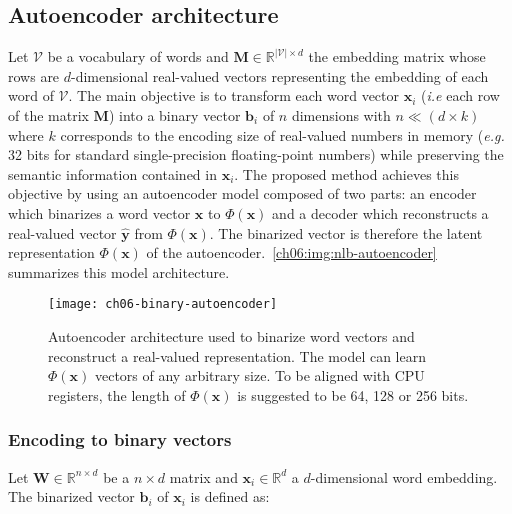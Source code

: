   \subsection{Autoencoder architecture}
    Let $\mathcal{V}$ be a vocabulary of words and $\mathbf{M} \in
    \mathbb{R}^{|\mathcal{V}| \times d}$ the embedding matrix whose rows are
    $d$-dimensional real-valued vectors representing the embedding of each word
    of $\mathcal{V}$. The main objective is to transform each word vector
    $\mathbf{x}_i$ (\textit{i.e} each row of the matrix $\mathbf{M}$) into a
    binary vector $\mathbf{b}_i$ of $n$ dimensions with $n \ll (d \times k)$
    where $k$ corresponds to the encoding size of real-valued numbers in memory
    (\textit{e.g.} 32 bits for standard single-precision floating-point numbers)
    while preserving the semantic information contained in $\mathbf{x}_i$. The
    proposed method achieves this objective by using an autoencoder model
    composed of two parts: an encoder which binarizes a word vector $\mathbf{x}$
    to $\Phi(\mathbf{x})$ and a decoder which reconstructs a real-valued vector
    $\hat{\mathbf{y}}$ from $\Phi(\mathbf{x})$. The binarized vector is
    therefore the latent representation $\Phi(\mathbf{x})$ of the
    autoencoder.~\autoref{ch06:img:nlb-autoencoder} summarizes this model
    architecture.

    \begin{figure}[h]
      \begin{center}
        \centerline{\texttt{[image: ch06-binary-autoencoder]}}
        \caption[Autoencoder architecture used to binarize word vectors.]
        {Autoencoder architecture used to binarize word vectors and reconstruct
        a real-valued representation. The model can learn $\Phi(\mathbf{x})$
        vectors of any arbitrary size. To be aligned with CPU registers, the
        length of $\Phi(\mathbf{x})$ is suggested to be 64, 128 or 256 bits.}
        \label{ch06:img:nlb-autoencoder}
      \end{center}
    \end{figure}

    \subsubsection{Encoding to binary vectors}
      Let $\mathbf{W} \in \mathbb{R}^{n \times d}$ be a $n \times d$ matrix and
      $\mathbf{x}_i \in \mathbb{R}^d$ a $d$-dimensional word embedding. The
      binarized vector $\mathbf{b}_i$ of $\mathbf{x}_i$ is defined as:

